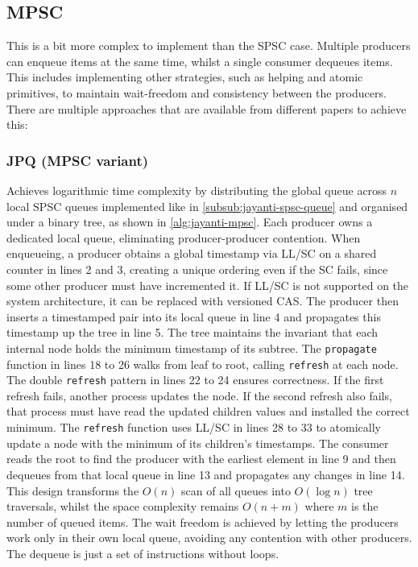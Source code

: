 \subsection{\acf{MPSC}}\label{subsec:multiple-producer-and-single-consumer}
This is a bit more complex to implement than the \ac{SPSC} case. Multiple producers can enqueue items at the same time, whilst a single consumer dequeues items. This includes implementing other strategies, such as helping and atomic primitives, to maintain wait-freedom and consistency between the producers. There are multiple approaches that are available from different papers to achieve this:

\subsubsection{\acf{JPQ} (\ac{MPSC} variant)}\label{subsub:jayanti-mpsc-queue}
Achieves logarithmic time complexity by distributing the global queue across $n$ local \ac{SPSC} queues implemented like in \cref{subsub:jayanti-spsc-queue} and organised under a binary tree, as shown in \cref{alg:jayanti-mpsc}. Each producer owns a dedicated local queue, eliminating producer-producer contention. When enqueueing, a producer obtains a global timestamp via \ac{LL/SC} on a shared counter in lines 2 and 3, creating a unique ordering even if the \ac{SC} fails, since some other producer must have incremented it. If \ac{LL/SC} is not supported on the system architecture, it can be replaced with versioned \ac{CAS}. The producer then inserts a timestamped pair into its local queue in line 4 and propagates this timestamp up the tree in line 5. The tree maintains the invariant that each internal node holds the minimum timestamp of its subtree. The \texttt{propagate} function in lines 18 to 26 walks from leaf to root, calling \texttt{refresh} at each node. The double \texttt{refresh} pattern in lines 22 to 24 ensures correctness. If the first refresh fails, another process updates the node. If the second refresh also fails, that process must have read the updated children values and installed the correct minimum. The \texttt{refresh} function uses \ac{LL/SC} in lines 28 to 33 to atomically update a node with the minimum of its children's timestamps. The consumer reads the root to find the producer with the earliest element in line 9 and then dequeues from that local queue in line 13 and propagates any changes in line 14. This design transforms the $O(n)$ scan of all queues into $O(\log n)$ tree traversals, whilst the space complexity remains $O(n + m)$ where $m$ is the number of queued items. The wait freedom is achieved by letting the producers work only in their own local queue, avoiding any contention with other producers. The dequeue is just a set of instructions without loops. \cite{JayantiLog}

